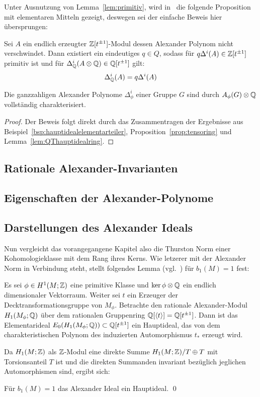 	 Unter Ausnutzung von Lemma~\ref{lem:primitiv}, wird in~\cite[Lemma~2.2]{Shinohara.1972} die folgende Proposition mit elementaren Mitteln gezeigt, deswegen sei der einfache Beweis hier übersprungen:
	 \begin{prop}
	 	\label{prop:tensoring}
	 	Sei $A$ ein endlich erzeugter $\mathbb{Z}[t^{\pm 1}]$-Modul dessen Alexander Polynom nicht verschwindet. Dann existiert ein eindeutiges $q\in Q$, sodass für $q\Delta^i(A) \in \mathbb{Z}[t^{\pm 1}]$ primitiv ist und für $\Delta^i_{\mathbb{Q}}(A\otimes \mathbb{Q}) \in \mathbb{Q}[t^{\pm 1}]$ gilt:
	 	\[
	 		 \Delta^i_{\mathbb{Q}}(A) = q\Delta^i(A) 
	 	\]
	 \end{prop}


\begin{cor}
	Die ganzzahligen Alexander Polynome $\Delta_\phi^i$ einer Gruppe $G$ sind durch $A_\phi(G) \otimes \mathbb{Q}$ vollständig charakterisiert.
\end{cor}
\begin{proof}
	Der Beweis folgt direkt durch das Zusammentragen der Ergebnisse aus Beispiel~\ref{bsp:hauptidealelementarteiler}, Proposition~\ref{prop:tensoring} und Lemma~\ref{lem:QThauptidealring}.
\end{proof}
    \subsection{Rationale Alexander-Invarianten}
        

    \subsection{Eigenschaften der Alexander-Polynome}
        
\subsection{Darstellungen des Alexander Ideals}
    

Nun vergleicht das vorangegangene Kapitel also die Thurston Norm einer Kohomologieklasse mit dem Rang ihres Kerns. Wie letzerer mit der Alexander Norm in Verbindung steht, stellt folgendes Lemma (vgl.~\cite[Assertion~4]{Milnor.2009}) für $b_1(M)=1$ fest:
\begin{lem}
	\label{lem:charPol}
	Es sei $\phi \in H^1(M;\mathbb{Z})$ eine primitive Klasse und $\ker \phi \otimes \mathbb{Q}$ ein endlich dimensionaler Vektorraum. Weiter sei $t$ ein Erzeuger der Decktransformationsgruppe von $M_\phi$. Betrachte den rationale Alexander-Modul $H_1(M_\phi;\mathbb{Q})$ über dem rationalen Gruppenring $\mathbb{Q}[\langle t \rangle] = \mathbb{Q}[t^{\pm 1}]$. Dann ist das Elementarideal $E_0(H_1(M_\phi;\mathbb{Q}))\subset \mathbb{Q}[t^{\pm1}]$ ein Hauptideal, das von dem charakteristischen Polynom des induzierten Automorphismus $t_*$ erzeugt wird.
\end{lem}
Da $H_1(M;\mathbb{Z})$ als $\mathbb{Z}$-Modul eine direkte Summe $H_1(M;\mathbb{Z})/T \oplus T$ mit Torsionsanteil $T$ ist und die direkten Summanden invariant bezüglich jeglichen Automorphismen sind, ergibt sich:
\begin{cor}
	Für $b_1(M)=1$ das Alexander Ideal ein Hauptideal. \qed
\end{cor}

